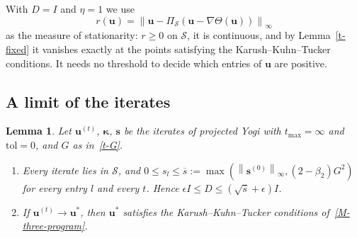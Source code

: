 \documentclass[11pt]{article}
\theoremstyle{plain}
\newtheorem{lemma}[theorem]{Lemma}
\theoremstyle{remark}
\numberwithin{equation}{section}
\begin{document}
With $D=I$ and $\eta=1$ we use
\begin{equation}\label{t-r}
r\left(\bm u\right)=\left\|\bm u-\Pi_{\mathcal{S}}\left(\bm u-\nabla\Theta\left(\bm u\right)\right)\right\|_\infty
\end{equation}
as the measure of stationarity: $r\ge 0$ on $\mathcal{S}$, it is continuous,
and by Lemma~\ref{t-fixed} it vanishes exactly at the points satisfying the
Karush--Kuhn--Tucker conditions. It needs no threshold to decide which entries
of $\bm u$ are positive.

\subsection{A limit of the iterates}

\begin{lemma}\label{t-yogi-limit}
Let $\bm u^{(t)}$, $\bm\kappa$, $\bm s$ be the iterates of
projected Yogi with $t_{\max}=\infty$ and $\mathrm{tol}=0$, and
$G$ as in~\eqref{t-G}.
\begin{enumerate}
\renewcommand{\labelenumi}{(\alph{enumi})}
\item Every iterate lies in $\mathcal{S}$, and
$0\le s_l\le\overline{s}:=\max\left(\left\|\bm s^{(0)}\right\|_\infty,(2-\beta_2)G^2\right)$
for every entry $l$ and every $t$. Hence
$\epsilon I\le D\le\left(\sqrt{\overline{s}}+\epsilon\right)I$.
\item If $\bm u^{(t)}\to\bm u^*$, then
$\bm u^*$ satisfies the Karush--Kuhn--Tucker conditions
of~\eqref{M-three-program}.
\end{enumerate}
\end{lemma}
\end{document}
